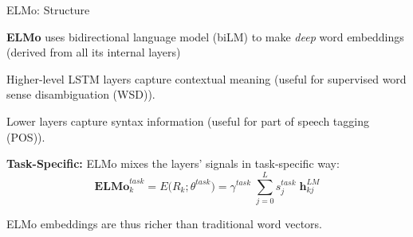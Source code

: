 \begin{frame}{ELMo: Structure}
    \vspace{20pt}
    \begin{itemizeSpaced}{2pt}
        \pinkbox \textbf{ELMo} uses bidirectional language model (biLM) to make \emph{deep} word embeddings (derived from all its internal layers)

        \pinkbox Higher-level LSTM layers capture contextual meaning (useful for supervised word sense disambiguation (WSD)).
        
        \pinkbox Lower layers capture syntax information (useful for part of speech tagging (POS)). 
        
        \item \textbf{Task-Specific: } ELMo mixes the layers' signals in task-specific way: \footnotemark 
        $$
        \textbf{ELMo}_k^{task} = E \Big( R_k; \theta^{task} \Big) = \gamma^{task} \; \sum_{j=0}^L s_j^{task} \; \mathbf{h}_{kj}^{LM}
        $$ 
        
        \item ELMo embeddings are thus richer than traditional word vectors. 
    \end{itemizeSpaced}
    
    
    
\end{frame}




